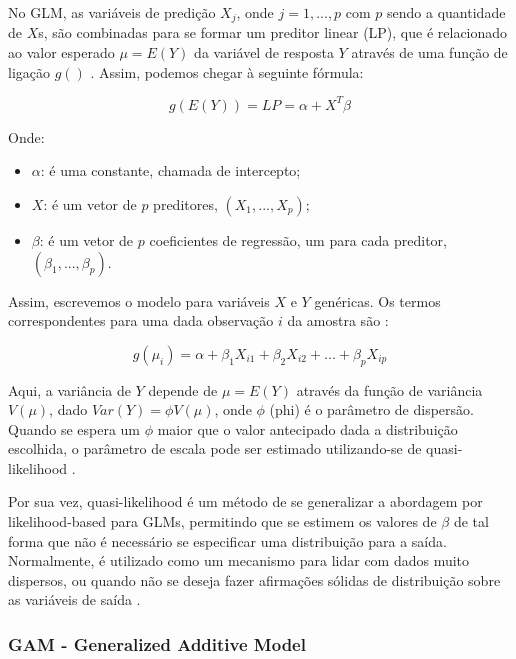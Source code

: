 \documentclass[
    12pt,               %
    openright,          %
    oneside,            %
    a4paper,            %
    english,            %
    brazil              %
    ]{abntex2}
\begin{document}
No GLM, as variáveis de predição $X_j$, onde $j = 1, ..., p$ com $p$ sendo a quantidade de $X$s, são combinadas para se formar um 
preditor linear (LP), que é relacionado ao valor esperado $\mu = E(Y)$ da variável de resposta $Y$ através de uma função de ligação $g()$ 
\cite{GAMeGLM_especie_estudo}. Assim, podemos chegar à seguinte fórmula: 

\begin{equation}
    \label{eq:lp_general}
    g(E(Y)) = LP = \alpha + X^T \beta
\end{equation}

Onde:
\begin{itemize}
    \item $\alpha$: é uma constante, chamada de intercepto;
    \item $X$: é um vetor de $p$ preditores, $(X_1, ..., X_p)$;
    \item $\beta$: é um vetor de $p$ coeficientes de regressão, um para cada preditor, $(\beta_1, ..., \beta_p)$.
\end{itemize}

Assim, escrevemos o modelo para variáveis $X$ e $Y$ genéricas. Os termos correspondentes para uma dada observação $i$ da 
amostra são \cite{GAMeGLM_especie_estudo}:

\begin{equation}
    \label{eq:glm_general}
    g(\mu_i) = \alpha + \beta_1X_{i1} + \beta_2X_{i2} + ... + \beta_pX_{ip}
\end{equation}

Aqui, a variância de $Y$ depende de $\mu = E(Y)$ através da função de variância $V(\mu)$, dado $Var(Y) = \phi V(\mu)$, onde $\phi$ (phi)
é o parâmetro de dispersão. Quando se espera um $\phi$ maior que o valor antecipado dada a distribuição escolhida, o parâmetro de
escala pode ser estimado utilizando-se de quasi-likelihood \cite{GAMeGLM_especie_estudo}.

Por sua vez, quasi-likelihood é um método de se generalizar a abordagem por likelihood-based para GLMs, permitindo que se estimem os valores
de $\beta$ de tal forma que não é necessário se especificar uma distribuição para a saída. Normalmente, é utilizado como um mecanismo
para lidar com dados muito dispersos, ou quando não se deseja fazer afirmações sólidas de distribuição sobre as variáveis de saída 
\cite{quase-likehood}.

\subsubsection{GAM - Generalized Additive Model}
\end{document}
